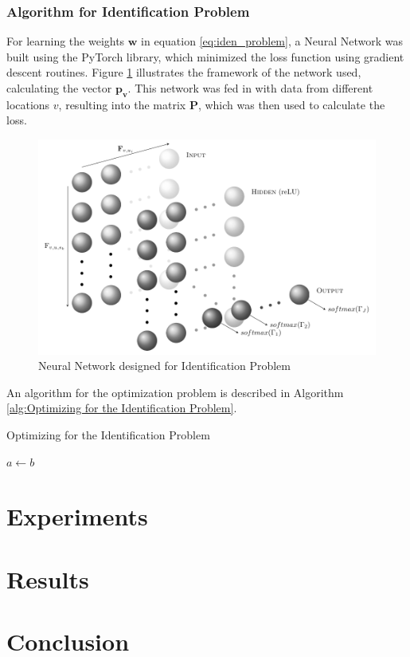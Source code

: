 \documentclass[12pt]{article}
\newcommand{\vect}[1]{\mathbf{#1}}  %
\newcommand{\matr}[1]{\mathbf{#1}}  %
\begin{document}
    \subsubsection{Algorithm for Identification Problem}
    For learning the weights $\matr{w}$ in equation \ref{eq:iden_problem}, a Neural Network was built using the PyTorch library, which minimized the loss function using gradient descent routines. Figure \ref{fig:Neural Network designed for Identification Problem} illustrates the framework of the network used, calculating the vector $\vect{p_v}$. This network was fed in with data from different locations $v$, resulting into the matrix $\matr{P}$, which was then used to calculate the loss.
    \begin{figure}[H]
        \centering
        \includegraphics[width=\textwidth]{weights_net}
        \caption{Neural Network designed for Identification Problem}
        \label{fig:Neural Network designed for Identification Problem}
    \end{figure}
    An algorithm for the optimization problem is described in Algorithm \ref{alg:Optimizing for the Identification Problem}.
    \begin{algorithm}
        \caption{Optimizing for the Identification Problem} \label{alg:Optimizing for the Identification Problem}
        \begin{algorithmic}[1]
            \State $a \gets b$
        \end{algorithmic}
    \end{algorithm}
    \section{Experiments}
    
    \section{Results}
    \section{Conclusion}
    
    \blindtext
    
    
\end{document}
